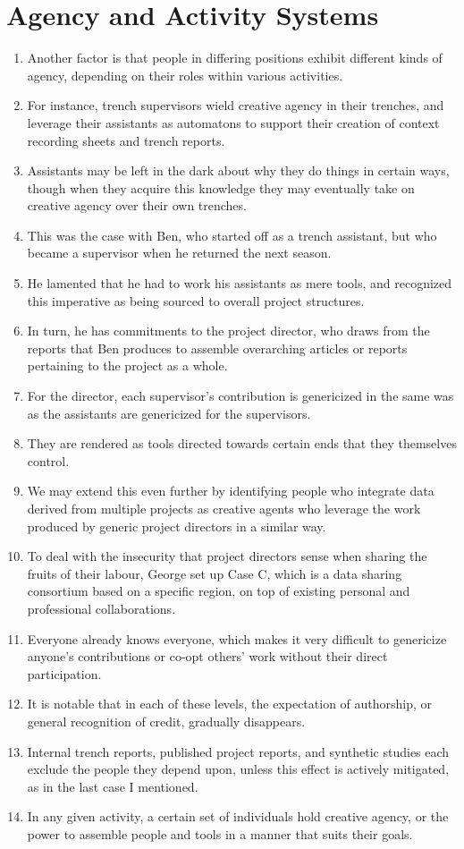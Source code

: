 \documentclass{article}
\begin{document}
\section{Agency and Activity Systems}
\begin{enumerate}
  \item Another factor is that people in differing positions exhibit different kinds of agency, depending on their roles within various activities.
  \item For instance, trench supervisors wield creative agency in their trenches, and leverage their assistants as automatons to support their creation of context recording sheets and trench reports.
  \item Assistants may be left in the dark about why they do things in certain ways, though when they acquire this knowledge they may eventually take on creative agency over their own trenches.
  \item This was the case with Ben, who started off as a trench assistant, but who became a supervisor when he returned the next season.
  \item He lamented that he had to work his assistants as mere tools, and recognized this imperative as being sourced to overall project structures.
  \item In turn, he has commitments to the project director, who draws from the reports that Ben produces to assemble overarching articles or reports pertaining to the project as a whole.
  \item For the director, each supervisor's contribution is genericized in the same was as the assistants are genericized for the supervisors.
  \item They are rendered as tools directed towards certain ends that they themselves control.
  \item We may extend this even further by identifying people who integrate data derived from multiple projects as creative agents who leverage the work produced by generic project directors in a similar way.
  \item To deal with the insecurity that project directors sense when sharing the fruits of their labour, George set up Case C, which is a data sharing consortium based on a specific region, on top of existing personal and professional collaborations.
  \item Everyone already knows everyone, which makes it very difficult to genericize anyone's contributions or co-opt others' work without their direct participation.
  
  \item It is notable that in each of these levels, the expectation of authorship, or general recognition of credit, gradually disappears.
  \item Internal trench reports, published project reports, and synthetic studies each exclude the people they depend upon, unless this effect is actively mitigated, as in the last case I mentioned.
  \item In any given activity, a certain set of individuals hold creative agency, or the power to assemble people and tools in a manner that suits their goals.
\end{enumerate}
\end{document}
